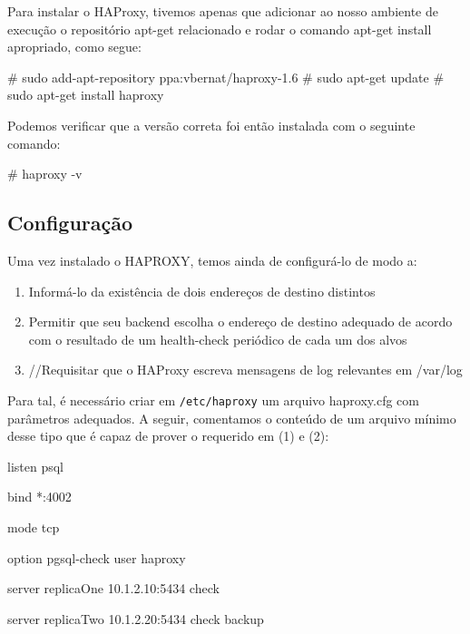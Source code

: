 \documentclass[a4paper,10pt]{article}
\begin{document}
        Para instalar o HAProxy, tivemos apenas que adicionar ao nosso ambiente de execução o repositório apt-get relacionado e rodar o comando apt-get install apropriado, como segue:

        \begin{spverbatim}
        # sudo add-apt-repository ppa:vbernat/haproxy-1.6
        # sudo apt-get update
        # sudo apt-get install haproxy
        \end{spverbatim}

        Podemos verificar que a versão correta foi então instalada com o seguinte comando:

       \begin{spverbatim}
        # haproxy -v
        \end{spverbatim}

    \subsection{Configuração}

        Uma vez instalado o HAPROXY, temos ainda de configurá-lo de modo a:

        \begin{enumerate}
        \item Informá-lo da existência de dois endereços de destino distintos
        \item Permitir que seu backend escolha o endereço de destino adequado de acordo com o resultado de um health-check periódico de cada um dos alvos
        \item //Requisitar que o HAProxy escreva mensagens de log relevantes em /var/log
        \end{enumerate}

        Para tal, é necessário criar em \verb|/etc/haproxy| um arquivo haproxy.cfg com parâmetros adequados.
        A seguir, comentamos o conteúdo de um arquivo mínimo desse tipo que é capaz de prover o requerido em (1) e (2):

       \begin{spverbatim}
        listen psql

       bind    *:4002

       mode  tcp

       option  pgsql-check user haproxy

       server  replicaOne  10.1.2.10:5434 check

       server  replicaTwo  10.1.2.20:5434 check backup
        \end{spverbatim}
\end{document}
